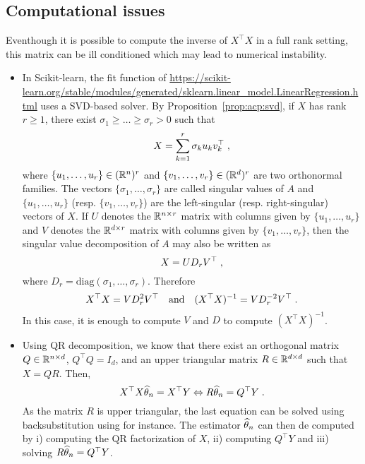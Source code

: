 \subsection{Computational issues}
Eventhough it is possible to compute  the inverse of $X^\top X$ in a full rank setting, this matrix can be ill conditioned which may lead to numerical instability. 
\begin{itemize}
\item In Scikit-learn, the fit function of \url{https://scikit-learn.org/stable/modules/generated/sklearn.linear\_model.LinearRegression.html} uses a SVD-based solver. By Proposition~\ref{prop:acp:svd}, if $X$ has  rank $r\geqslant 1$, there exist $\sigma_1\geqslant \ldots \geqslant \sigma_r>0$ such that
\[
X = \sum_{k=1}^r \sigma_k u_k v^\top_k\;,
\]
where $\{u_1,\ldots,u_r\}\in (\mathbb{R}^n)^r$ and $\{v_1,\ldots,v_r\}\in (\mathbb{R}^d)^r$ are two orthonormal families. The vectors $\{\sigma_1,\ldots,\sigma_r\}$ are called singular values of $A$ and $\{u_1,\ldots,u_r\}$ (resp. $\{v_1,\ldots,v_r\}$) are the left-singular (resp. right-singular) vectors of $X$. If $U$ denotes the $\mathbb{R}^{n\times r}$ matrix with columns given by $\{u_1,\ldots,u_r\}$ and $V$ denotes the $\mathbb{R}^{d \times r}$ matrix with columns given by $\{v_1,\ldots,v_r\}$, then the singular value decomposition of $A$ may also be written as
\[
X = UD_rV^\top\;,
\]
where $D_r = \mathrm{diag}(\sigma_1,\ldots,\sigma_r)$. Therefore 
$$
X^\top X = VD^2_rV^\top\quad\mathrm{and}\quad (X^\top X)^{-1} =  VD^{-2}_rV^\top\;.
$$
In this case, it is enough to compute $V$ and $D$ to compute $(X^\top X)^{-1}$.
\item Using QR decomposition, we know that there exist an orthogonal matrix $Q\in\mathbb{R}^{n\times d}$, $Q^\top Q = I_d$, and an upper triangular matrix $R\in\mathbb{R}^{d\times d}$ such that $X = QR$. Then,
$$
X^\top X \widehat{\theta}_n = X^\top Y \Leftrightarrow R\widehat {\theta}_n = Q^\top Y\;.
$$
As the matrix $R$ is upper triangular, the last equation can be solved using backsubstitution using for instance. The estimator $\widehat{\theta}_n$ can then de computed by i) computing the QR factorization of $X$, ii) computing $Q^\top Y$ and iii) solving $R\widehat {\theta}_n = Q^\top Y$.
\end{itemize}
